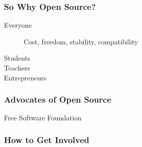 \documentclass{beamer}
\begin{document}
\begin{frame}
  \frametitle{So Why Open Source?}
  \begin{description}
  \item[Everyone] Cost, freedom, stability, compatibility
  \item[Students] 
  \item[Teachers]
  \item[Entrepreneurs] 
  \end{description}
\end{frame}

\begin{frame}
  \frametitle{Advocates of Open Source}
  \begin{description}
  \item[Free Software Foundation] 
  \end{description}
\end{frame}

\begin{frame}
  \frametitle{How to Get Involved}
\end{frame}
\end{document}
